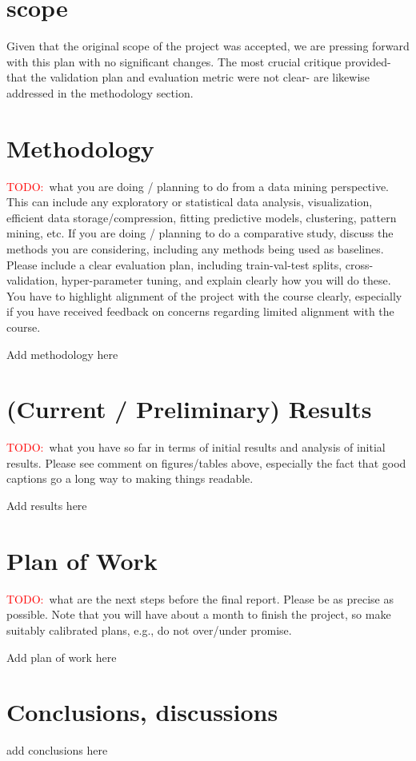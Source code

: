 \documentclass[11pt]{extarticle}
\newcommand{\todo}{\textcolor{red}{TODO:}~}
\begin{document}
\section{scope}

\begin{mdframed}
    Given that the original scope of the project was accepted, we are pressing forward with this plan with no significant changes.
    The most crucial critique provided- that the validation plan and evaluation metric were not clear- are likewise addressed in the methodology section.
\end{mdframed}

\section{Methodology} 
\todo what you are doing / planning to do from a data mining perspective. 
This can include any exploratory or statistical data analysis, visualization, efficient data storage/compression, fitting predictive models, clustering, pattern mining, etc.  
If you are doing / planning to do a comparative study, discuss the methods you are considering, including any methods being used as baselines.  
Please include a clear evaluation plan, including train-val-test splits, cross-validation, hyper-parameter tuning, and explain clearly how you will do these. 
You have to highlight alignment of the project with the course clearly, especially if you have received feedback on concerns regarding limited alignment with the course. 

\begin{mdframed}
    Add methodology here
\end{mdframed}

\section{(Current / Preliminary) Results} 
\todo what you have so far in terms of initial results and analysis of initial results. Please see comment on figures/tables above, especially the fact that good captions go a long way to making things readable.

\begin{mdframed}
    Add results here
\end{mdframed}

\section{Plan of Work} 
\todo what are the next steps before the final report. Please be as precise as possible. Note that you will have about a month to finish the project, so make suitably calibrated plans, e.g., do not over/under promise.

\begin{mdframed}
    Add plan of work here
\end{mdframed}

\section{Conclusions, discussions}

\begin{mdframed}
    add conclusions here
\end{mdframed}



\end{document}
